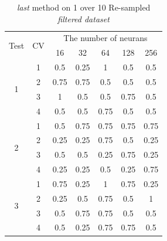 \documentclass[draft,dvipsnames]{drexel-thesis}
\begin{document}
\begin{thesis}
\begin{table}[!t]
\centering
\caption{{\em last} method on 1 over 10 Re-sampled {\em filtered dataset}}
\label{tbl:last_1_10}
\begin{tabular}{|c|c|c|c|c|c|c|}
\hline
\multirow{2}{*}{Test} & \multirow{2}{*}{CV} & \multicolumn{5}{c|}{The number of neurans}                               \\ \cline{3-7} 
                      &                     & 16           & 32           & 64           & 128          & 256          \\ \hline
\multirow{4}{*}{1}    & 1                   & 0.5          & 0.25         & 1            & 0.5          & 0.5          \\ \cline{2-7} 
                      & 2                   & 0.75         & 0.75         & 0.5          & 0.5          & 0.5          \\ \cline{2-7} 
                      & 3                   & 1            & 0.5          & 0.5          & 0.75         & 0.5          \\ \cline{2-7} 
                      & 4                   & 0.5          & 0.5          & 0.75         & 0.5          & 0.5          \\ \hline
\multirow{4}{*}{2}    & 1                   & 0.5          & 0.75         & 0.75         & 0.75         & 0.75         \\ \cline{2-7} 
                      & 2                   & 0.25         & 0.25         & 0.75         & 0.5          & 0.25         \\ \cline{2-7} 
                      & 3                   & 0.5          & 0.5          & 0.25         & 0.75         & 0.25         \\ \cline{2-7} 
                      & 4                   & 0.25         & 0.25         & 0.5          & 0.25         & 0.75         \\ \hline
\multirow{4}{*}{3}    & 1                   & 0.75         & 0.25         & 1            & 0.75         & 0.25         \\ \cline{2-7} 
                      & 2                   & 0.25         & 0.5          & 0.75         & 0.5          & 1            \\ \cline{2-7} 
                      & 3                   & 0.5          & 0.75         & 0.75         & 0.5          & 0.5          \\ \cline{2-7} 
                      & 4                   & 0.5          & 0.25         & 0.75         & 0.75         & 0.5          \\ \hline

\end{tabular}
\end{table}
\end{thesis}
\end{document}
